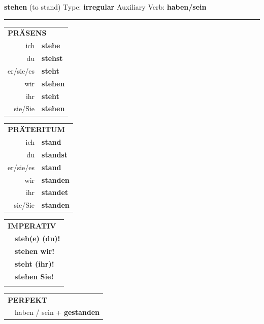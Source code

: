 \documentclass[10pt,a4paper]{revtex4-2}
\begin{document}
\begin{verbbox}
    {\Large \bf stehen} (to stand) \hfill Type: \textbf{irregular} \hfill Auxiliary Verb: \textbf{haben/sein} 
    
     \vspace{5pt}

    \hrule
    
    \vspace{5pt}

  \begin{tabular}{rl}
     \multicolumn{2}{l}{\textbf{PRÄSENS} }\\
    ich & \textbf{stehe}\\
    du & \textbf{stehst}\\
    er/sie/es & \textbf{steht}\\
    wir & \textbf{stehen}\\
    ihr & \textbf{steht}\\
    sie/Sie & \textbf{stehen}\\
  \end{tabular}
  \hfill
     \begin{tabular}{rl}
    \multicolumn{2}{l}{\textbf{PRÄTERITUM} }\\
    ich & \textbf{stand}\\
    du & \textbf{standst}\\
    er/sie/es & \textbf{stand}\\
    wir & \textbf{standen}\\
    ihr & \textbf{standet}\\
    sie/Sie & \textbf{standen}\\
  \end{tabular}
  \hfill
  \begin{tabular}{rl}
     \multicolumn{2}{l}{\textbf{IMPERATIV} }\\
   & \textbf{steh(e) (du)!}\\
   & \textbf{stehen wir!}\\
   & \textbf{steht (ihr)!}\\
   & \textbf{stehen Sie!}\\
   & \vspace{10pt}
  \end{tabular}

    \vspace{10pt}

 \begin{tabular}{rl}
     \multicolumn{2}{l}{\textbf{PERFEKT}}\\
  &  haben / sein + \textbf{gestanden}\\
  \end{tabular}
\hfill
   \begin{tabular}{rl}
   

\end{tabular}
\end{verbbox}
\end{document}
